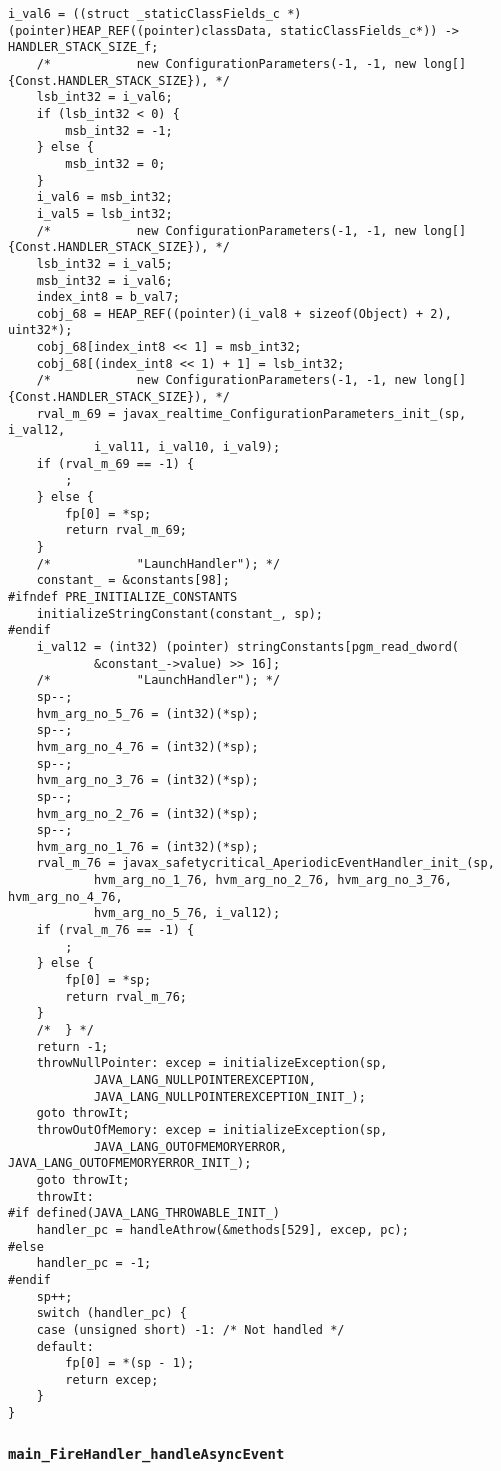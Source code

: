 \begin{lstlisting}[firstnumber=55384]
	i_val6 = ((struct _staticClassFields_c *)(pointer)HEAP_REF((pointer)classData, staticClassFields_c*)) -> HANDLER_STACK_SIZE_f;
	/*			  new ConfigurationParameters(-1, -1, new long[] {Const.HANDLER_STACK_SIZE}), */
	lsb_int32 = i_val6;
	if (lsb_int32 < 0) {
		msb_int32 = -1;
	} else {
		msb_int32 = 0;
	}
	i_val6 = msb_int32;
	i_val5 = lsb_int32;
	/*			  new ConfigurationParameters(-1, -1, new long[] {Const.HANDLER_STACK_SIZE}), */
	lsb_int32 = i_val5;
	msb_int32 = i_val6;
	index_int8 = b_val7;
	cobj_68 = HEAP_REF((pointer)(i_val8 + sizeof(Object) + 2), uint32*);
	cobj_68[index_int8 << 1] = msb_int32;
	cobj_68[(index_int8 << 1) + 1] = lsb_int32;
	/*			  new ConfigurationParameters(-1, -1, new long[] {Const.HANDLER_STACK_SIZE}), */
	rval_m_69 = javax_realtime_ConfigurationParameters_init_(sp, i_val12,
			i_val11, i_val10, i_val9);
	if (rval_m_69 == -1) {
		;
	} else {
		fp[0] = *sp;
		return rval_m_69;
	}
	/*			  "LaunchHandler"); */
	constant_ = &constants[98];
#ifndef PRE_INITIALIZE_CONSTANTS
	initializeStringConstant(constant_, sp);
#endif
	i_val12 = (int32) (pointer) stringConstants[pgm_read_dword(
			&constant_->value) >> 16];
	/*			  "LaunchHandler"); */
	sp--;
	hvm_arg_no_5_76 = (int32)(*sp);
	sp--;
	hvm_arg_no_4_76 = (int32)(*sp);
	sp--;
	hvm_arg_no_3_76 = (int32)(*sp);
	sp--;
	hvm_arg_no_2_76 = (int32)(*sp);
	sp--;
	hvm_arg_no_1_76 = (int32)(*sp);
	rval_m_76 = javax_safetycritical_AperiodicEventHandler_init_(sp,
			hvm_arg_no_1_76, hvm_arg_no_2_76, hvm_arg_no_3_76, hvm_arg_no_4_76,
			hvm_arg_no_5_76, i_val12);
	if (rval_m_76 == -1) {
		;
	} else {
		fp[0] = *sp;
		return rval_m_76;
	}
	/*	} */
	return -1;
	throwNullPointer: excep = initializeException(sp,
			JAVA_LANG_NULLPOINTEREXCEPTION,
			JAVA_LANG_NULLPOINTEREXCEPTION_INIT_);
	goto throwIt;
	throwOutOfMemory: excep = initializeException(sp,
			JAVA_LANG_OUTOFMEMORYERROR, JAVA_LANG_OUTOFMEMORYERROR_INIT_);
	goto throwIt;
	throwIt:
#if defined(JAVA_LANG_THROWABLE_INIT_)
	handler_pc = handleAthrow(&methods[529], excep, pc);
#else
	handler_pc = -1;
#endif
	sp++;
	switch (handler_pc) {
	case (unsigned short) -1: /* Not handled */
	default:
		fp[0] = *(sp - 1);
		return excep;
	}
}
\end{lstlisting}


\subsubsection{\texttt{main\_FireHandler\_handleAsyncEvent}}

